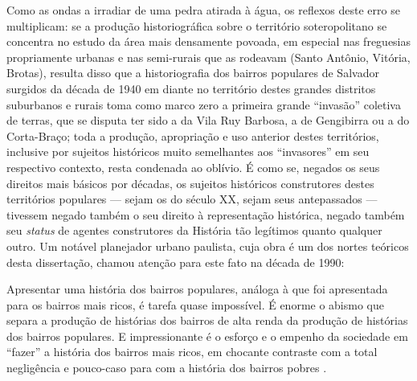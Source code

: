 Como as ondas a irradiar de uma pedra atirada à água, os reflexos deste erro se multiplicam: se a produção historiográfica sobre o território soteropolitano se concentra no estudo da área mais densamente povoada, em especial nas freguesias propriamente urbanas e nas semi-rurais que as rodeavam (Santo Antônio, Vitória, Brotas), resulta disso que a historiografia dos bairros populares de Salvador surgidos da década de 1940 em diante no território destes grandes distritos suburbanos e rurais toma como marco zero a primeira grande ``invasão'' coletiva de terras, que se disputa ter sido a da Vila Ruy Barbosa, a de Gengibirra ou a do Corta-Braço; toda a produção, apropriação e uso anterior destes territórios, inclusive por sujeitos históricos muito semelhantes aos ``invasores'' em seu respectivo contexto, resta condenada ao oblívio. É como se, negados os seus direitos mais básicos por décadas, os sujeitos históricos construtores destes territórios populares --- sejam os do século XX, sejam seus antepassados ---  tivessem negado também o seu direito à representação histórica, negado também seu \textit{status} de agentes construtores da História tão legítimos quanto qualquer outro. Um notável planejador urbano paulista, cuja obra é um dos nortes teóricos desta dissertação, chamou atenção para este fato na década de 1990:

\begin{citacao}
Apresentar uma história dos bairros populares, análoga à que foi apresentada para os bairros mais ricos, é tarefa quase impossível. É enorme o abismo que separa a produção de histórias dos bairros de alta renda da produção de histórias dos bairros populares. E impressionante é o esforço e o empenho da sociedade em ``fazer'' a história dos bairros mais ricos, em chocante contraste com a total negligência e pouco-caso para com a história dos bairros pobres \cite[p.~226]{villaca_intraurbano_2017}.
\end{citacao}


